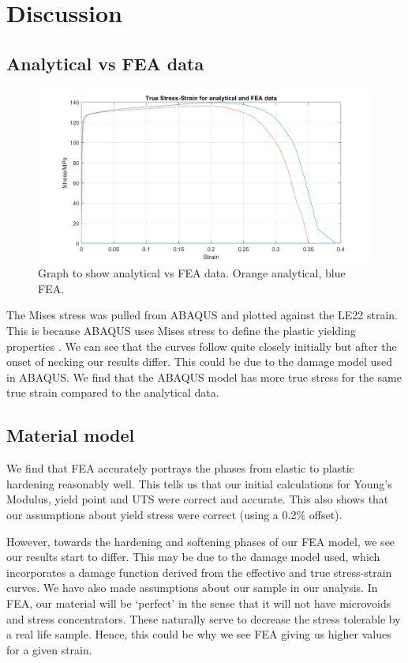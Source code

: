\documentclass[11pt]{article}
\numberwithin{equation}{section}
\begin{document}
\section{Discussion}
\subsection{Analytical vs FEA data}
\begin{figure}[H]
    \centering
    \includegraphics[width = \textwidth]{./img/comparisonData.png}
    \caption{Graph to show analytical vs FEA data. Orange analytical, blue FEA.}
\end{figure}
The Mises stress was pulled from ABAQUS and plotted against the LE22 strain. This is because ABAQUS uses Mises stress to define the plastic yielding properties \cite{b3}. We can see that the curves follow quite closely initially but after the onset of necking our results differ. This could be due to the damage model used in ABAQUS. We find that the ABAQUS model has more true stress for the same true strain compared to the analytical data.
\subsection{Material model}
We find that FEA accurately portrays the phases from elastic to plastic hardening reasonably well. This tells us that our initial calculations for Young's Modulus, yield point and UTS were correct and accurate. This also shows that our assumptions about yield stress were correct (using a 0.2\% offset). 

However, towards the hardening and softening phases of our FEA model, we see our results start to differ. This may be due to the damage model used, which incorporates a damage function derived from the effective and true stress-strain curves. We have also made assumptions about our sample in our analysis. In FEA, our material will be `perfect' in the sense that it will not have microvoids and stress concentrators. These naturally serve to decrease the stress tolerable by a real life sample. Hence, this could be why we see FEA giving us higher values for a given strain. 
\end{document}
